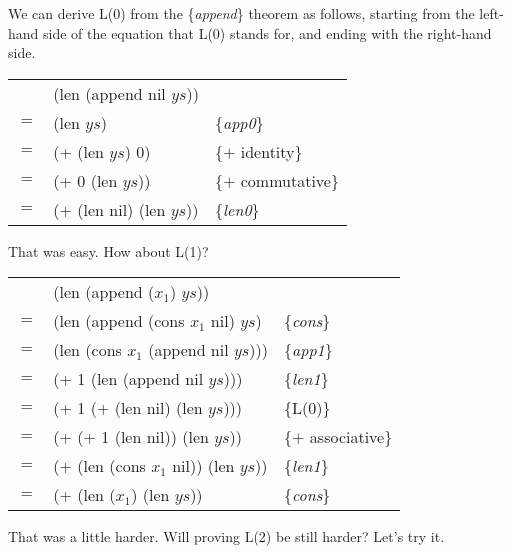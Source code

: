 We can derive L(0) from the \{\emph{append}\} theorem as follows, starting from the left-hand side of the equation that L(0) stands for, and ending with the right-hand side.

\begin{center}
\begin{tabular}{lll}
    & (len (append nil $ys$))  &                     \\
$=$ & (len $ys$)               & \{\emph{app0}\}     \\
$=$ & (+ (len $ys$) 0)         & \{$+$ identity\}    \\
$=$ & (+ 0 (len $ys$))         & \{$+$ commutative\} \\
$=$ & (+ (len nil) (len $ys$)) & \{\emph{len0}\} \\
\end{tabular}
\end{center}

That was easy. How about L(1)?

\begin{center}
\begin{tabular}{lll}
    & (len (append ($x_1$) $ys$))           &                     \\
$=$ & (len (append (cons $x_1$ nil) $ys$)   & \{\emph{cons}\}     \\
$=$ & (len (cons $x_1$ (append nil $ys$)))  & \{\emph{app1}\}     \\
$=$ & (+ 1 (len (append nil $ys$)))         & \{\emph{len1}\}     \\
$=$ & (+ 1 (+ (len nil) (len $ys$)))        & \{L(0)\}            \\
$=$ & (+ (+ 1 (len nil)) (len $ys$))        & \{$+$ associative\} \\
$=$ & (+ (len (cons $x_1$ nil)) (len $ys$)) & \{\emph{len1}\}     \\
$=$ & (+ (len ($x_1$) (len $ys$))           & \{\emph{cons}\}     \\
\end{tabular}
\end{center}

That was a little harder. Will proving L(2) be still harder? Let's try it.

